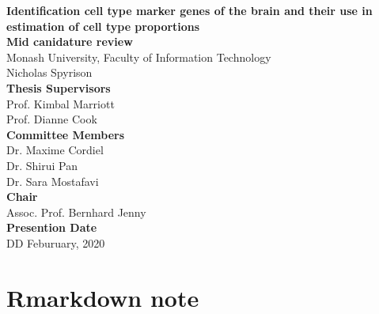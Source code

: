 \documentclass[11,]{article}
\title{}
\author{}
\date{}
\begin{document}

\onehalfspacing
{}

\begin{center}
\LARGE{\textbf{Identification cell type marker genes of the brain and their use in estimation of cell type proportions}}\\
\vspace*{2\baselineskip}
\Large{\textbf{Mid canidature review}}\\
\normalsize{Monash University, Faculty of Information Technology}\\
\vspace*{2\baselineskip}
\Large{Nicholas Spyrison}\\ %
\vspace*{3\baselineskip}
\Large{\textbf{Thesis Supervisors}}\\
Prof. Kimbal Marriott\\
Prof. Dianne Cook\\
\vspace*{2\baselineskip}
\Large{\textbf{Committee Members}}\\
Dr. Maxime Cordiel\\
Dr. Shirui Pan\\
Dr. Sara Mostafavi\\
\vspace*{1\baselineskip}
\Large{\textbf{Chair}}\\
Assoc. Prof. Bernhard Jenny\\
\vspace*{1\baselineskip}
\Large{\textbf{Presention Date}}\\
DD Feburuary, 2020
\end{center}

\doublespacing

\hypersetup{linkcolor = blue}
\newpage
{}
\tableofcontents
{}

\newpage

% 

\doublespacing

\newpage
{}
\hypersetup{linkcolor = blue}

{
\hypersetup{linkcolor=black}
\setcounter{tocdepth}{2}
\tableofcontents
}
\hypertarget{sec:intro}{%
\section{Rmarkdown note}\label{sec:intro}}
\end{document}
